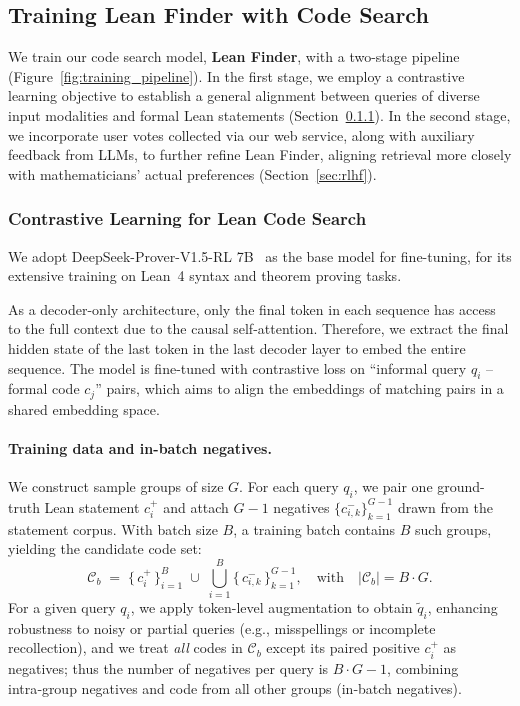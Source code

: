 \documentclass{article} %
\begin{document}
\subsection{Training Lean Finder with Code Search}
\label{sec:code_search_model_training}
We train our code search model, \textbf{Lean Finder}, with a two-stage pipeline (Figure~\ref{fig:training_pipeline}). In the first stage, we employ a contrastive learning objective to establish a general alignment between queries of diverse input modalities and formal Lean statements (Section~\ref{sec:constrastive_learning}).
In the second stage, we incorporate user votes collected via our web service, along with auxiliary feedback from LLMs, to further refine Lean Finder, aligning retrieval more closely with mathematicians’ actual preferences (Section~\ref{sec:rlhf}).

\subsubsection{Contrastive Learning for Lean Code Search}
\label{sec:constrastive_learning}
We adopt DeepSeek-Prover-V1.5-RL 7B~\citep{xin2024deepseekv15} as the base model for fine-tuning, for its extensive training on Lean~4 syntax and theorem proving tasks.

As a decoder-only architecture, only the final token in each sequence has access to the full context due to the causal self-attention.
Therefore, we extract the final hidden state of the last token in the last decoder layer to embed the entire sequence.
The model is fine-tuned with contrastive loss on ``informal query $q_i$ -- formal code $c_j$'' pairs, which aims to align the embeddings of matching
pairs in a shared embedding space.


\paragraph{Training data and in-batch negatives.}
We construct sample groups of size \(G\). For each query \(q_i\), we pair one ground-truth Lean statement \(c_i^{+}\) and attach \(G\!-\!1\) negatives \(\{c_{i,k}^{-}\}_{k=1}^{G-1}\) drawn from the statement corpus. With batch size \(B\), a training batch contains \(B\) such groups, yielding the candidate code set:
\[
\mathcal{C}_b \;=\; \{\,c_i^{+}\,\}_{i=1}^{B} \;\cup\; \bigcup_{i=1}^{B}\{\,c_{i,k}^{-}\,\}_{k=1}^{G-1},
\quad\text{with}\quad |\mathcal{C}_b| = B \cdot G.
\]
For a given query \(q_i\), we apply token-level augmentation to obtain $\tilde q_i$, enhancing robustness to noisy or partial queries (e.g., misspellings or incomplete recollection),
and we treat \emph{all} codes in \(\mathcal{C}_b\) except its paired positive \(c_i^{+}\) as negatives; thus the number of negatives per query is \(B\cdot G - 1\), combining intra‑group negatives and code from all other groups (in‑batch negatives).
\end{document}
